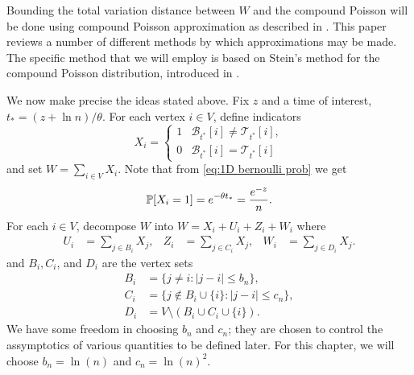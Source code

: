 	Bounding the total variation distance between $W$ and the compound Poisson will be done using compound Poisson approximation as described in \cite{Barbour2001-nh}. This paper reviews a number of different methods by which approximations may be made. The specific method that we will employ is based on Stein's method for the compound Poisson distribution, introduced in \cite{Barbour1992-mc}.

	We now make precise the ideas stated above.	Fix $z$ and a time of interest, $t_* = (z + \ln n)/\theta$. For each vertex $i \in V$, define indicators
	\begin{equation}
		X_i = 
		\begin{cases}
			1 & \mathscr{B}_{t^*}[i] \neq \mathscr{T}_{t^*}[i],\\
			0 & \mathscr{B}_{t^*}[i] = \mathscr{T}_{t^*}[i]
		\end{cases}
	\end{equation}
	and set $W = \sum_{i \in V} X_i$.
	Note that from \eqref{eq:1D bernoulli prob} we get
	\begin{equation}
		\label{eq:1D prob X_i}
		\mathbb{P}[X_i = 1] = e^{-\theta t_*} = \frac{e^{-z}}{n}.
	\end{equation}
	For each $i \in V$, decompose $W$ into $W = X_i + U_i + Z_i + W_i$ where
	\begin{align}
		U_i &= \sum_{j \in B_i} X_j, &
		Z_i &= \sum_{j \in C_i} X_j, &
		W_i &= \sum_{j \in D_i} X_j.
	\end{align}
	and $B_i, C_i$, and $D_i$ are the vertex sets
	\begin{align}
		B_i &= \{j\neq i : |j - i| \leq b_n \},\\
		C_i &= \{j\notin B_i\cup \{i\}: |j - i| \leq c_n \},\\
		D_i &= V \setminus (B_i \cup C_i \cup \{i\}).
	\end{align}
	We have some freedom in choosing $b_n$ and $c_n$; they are chosen to control the assymptotics of various quantities to be defined later. For this chapter, we will choose $b_n = \ln(n)$ and $c_n = \ln(n)^2$.

